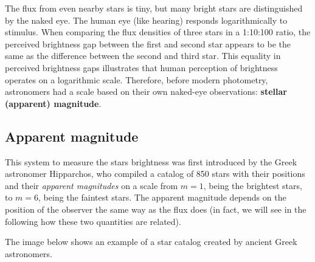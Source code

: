 \documentclass[
  letterpaper,
  DIV=11,
  numbers=noendperiod]{scrreprt}
\begin{document}
The flux from even nearby stars is tiny, but many bright stars are
distinguished by the naked eye. The human eye (like hearing) responds
logarithmically to stimulus. When comparing the flux densities of three
stars in a 1:10:100 ratio, the perceived brightness gap between the
first and second star appears to be the same as the difference between
the second and third star. This equality in perceived brightness gaps
illustrates that human perception of brightness operates on a
logarithmic scale. Therefore, before modern photometry, astronomers had
a scale based on their own naked-eye observations: \textbf{stellar
(apparent) magnitude}.

\hypertarget{apparent-magnitude}{%
\subsection{Apparent magnitude}\label{apparent-magnitude}}

This system to measure the stars brightness was first introduced by the
Greek astronomer Hipparchos, who compiled a catalog of 850 stars with
their positions and their \emph{apparent magnitudes} on a scale from
\(m=1\), being the brightest stars, to \(m=6\), being the faintest
stars. The apparent magnitude depends on the position of the observer
the same way as the flux does (in fact, we will see in the following how
these two quantities are related).

The image below shows an example of a star catalog created by ancient
Greek astronomers.
\end{document}
